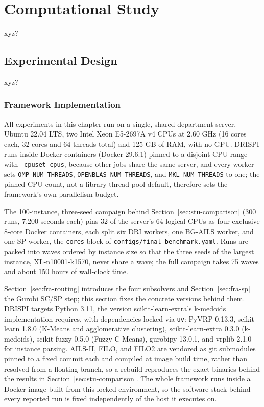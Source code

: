 \chapter{Computational Study}\label{chapter:study}
xyz?

\section{Experimental Design}\label{sec:stu-experiment}
xyz?

\subsection{Framework Implementation}\label{sec:stu-implementation}
All experiments in this chapter run on a single, shared department server, Ubuntu 22.04 LTS, two Intel Xeon E5-2697A v4 CPUs at 2.60 GHz (16 cores each, 32 cores and 64 threads total) and 125 GB of RAM, with no GPU\@. DRISPI runs inside Docker containers (Docker 29.6.1) pinned to a disjoint CPU range with \texttt{--cpuset-cpus}, because other jobs share the same server, and every worker sets \texttt{OMP\_NUM\_THREADS}, \texttt{OPENBLAS\_NUM\_THREADS}, and \texttt{MKL\_NUM\_THREADS} to one; the pinned CPU count, not a library thread-pool default, therefore sets the framework's own parallelism budget.

The 100-instance, three-seed campaign behind Section~\ref{sec:stu-comparison} (300 runs, 7{,}200 seconds each) pins 32 of the server's 64 logical CPUs as four exclusive 8-core Docker containers, each split six DRI workers, one BG-AILS worker, and one SP worker, the \texttt{cores} block of \texttt{configs/final\_benchmark.yaml}. Runs are packed into waves ordered by instance size so that the three seeds of the largest instance, XL-n10001-k1570, never share a wave; the full campaign takes 75 waves and about 150 hours of wall-clock time.

Section~\ref{sec:fra-routing} introduces the four subsolvers and Section~\ref{sec:fra-sp} the Gurobi SC/SP step; this section fixes the concrete versions behind them. DRISPI targets Python 3.11, the version scikit-learn-extra's k-medoids implementation requires, with dependencies locked via \texttt{uv}: PyVRP 0.13.3, scikit-learn 1.8.0 (K-Means and agglomerative clustering), scikit-learn-extra 0.3.0 (k-medoids), scikit-fuzzy 0.5.0 (Fuzzy C-Means), gurobipy 13.0.1, and vrplib 2.1.0 for instance parsing. AILS-II, FILO, and FILO2 are vendored as git submodules pinned to a fixed commit each and compiled at image build time, rather than resolved from a floating branch, so a rebuild reproduces the exact binaries behind the results in Section~\ref{sec:stu-comparison}. The whole framework runs inside a Docker image built from this locked environment, so the software stack behind every reported run is fixed independently of the host it executes on.

